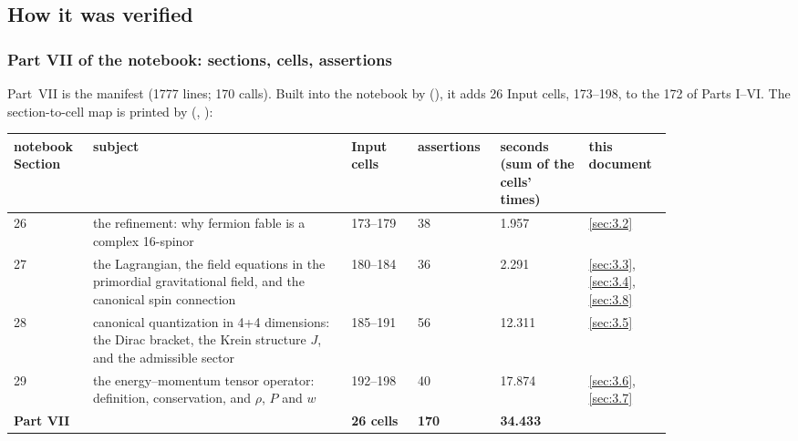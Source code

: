 \subsection{How it was verified}
\label{sec:3.9}

\subsubsection{Part VII of the notebook: sections, cells, assertions}
\label{sec:3.9.1}

Part~VII is the manifest  (1777 lines; 170  calls).
Built into the notebook by  (), it adds 26 Input
cells, 173--198, to the 172 of Parts I--VI. The section-to-cell map is printed by
 (, ):

{\small
\begin{longtable}{@{}p{0.09\linewidth}p{0.35\linewidth}p{0.09\linewidth}p{0.09\linewidth}p{0.12\linewidth}p{0.1\linewidth}@{}}
\toprule
\raggedright notebook Section & \raggedright subject & \raggedright Input cells & \raggedright assertions & \raggedright seconds (sum of the cells' times) & \raggedright this document \tabularnewline
\midrule
\endhead
\raggedright 26 & \raggedright the refinement: why fermion fable is a complex 16-spinor & \raggedright 173--179 & \raggedright 38 & \raggedright 1.957 & \raggedright \ref{sec:3.2} \tabularnewline
\raggedright 27 & \raggedright the Lagrangian, the field equations in the primordial gravitational field, and the canonical spin connection & \raggedright 180--184 & \raggedright 36 & \raggedright 2.291 & \raggedright \ref{sec:3.3}, \ref{sec:3.4}, \ref{sec:3.8} \tabularnewline
\raggedright 28 & \raggedright canonical quantization in 4+4 dimensions: the Dirac bracket, the Krein structure $J$, and the admissible sector & \raggedright 185--191 & \raggedright 56 & \raggedright 12.311 & \raggedright \ref{sec:3.5} \tabularnewline
\raggedright 29 & \raggedright the energy--momentum tensor operator: definition, conservation, and $\rho$, $P$ and $w$ & \raggedright 192--198 & \raggedright 40 & \raggedright 17.874 & \raggedright \ref{sec:3.6}, \ref{sec:3.7} \tabularnewline
\midrule
\raggedright \textbf{Part VII} & & \raggedright \textbf{26 cells} & \raggedright \textbf{170} & \raggedright \textbf{34.433} & \tabularnewline
\bottomrule
\end{longtable}
}

